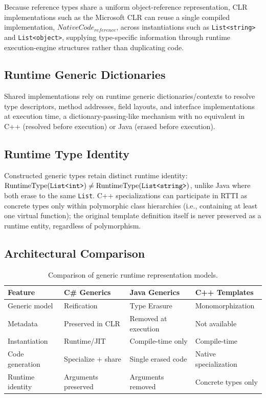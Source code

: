 \documentclass[11pt]{report}
\begin{document}
Because reference types share a uniform object-reference representation,
CLR implementations such as the Microsoft CLR can reuse a single compiled
implementation, $NativeCode_{reference}$, across instantiations such as
\texttt{List<string>} and \texttt{List<object>}, supplying type-specific
information through runtime execution-engine structures rather than
duplicating code.

\subsection{Runtime Generic Dictionaries}

Shared implementations rely on runtime generic dictionaries/contexts to
resolve type descriptors, method addresses, field layouts, and interface
implementations at execution time, a dictionary-passing-like mechanism
with no equivalent in C++ (resolved before execution) or Java (erased
before execution).

\subsection{Runtime Type Identity}
\label{CSharpGenerics:RuntimeRepresentation:TypeIdentity}

Constructed generic types retain distinct runtime identity:
$\text{RuntimeType}(\texttt{List<int>}) \neq \newline \text{RuntimeType}(\texttt{List<string>})$,
unlike Java where both erase to the same \texttt{List}. C++ specializations can participate in 
RTTI as concrete types only within
polymorphic class hierarchies (i.e., containing at least one virtual
function); the original template definition itself is never preserved as
a runtime entity, regardless of polymorphism.

\subsection{Architectural Comparison}

\begin{table}[h]
\centering
\begin{tabular}{|p{2.3cm}|p{2.9cm}|p{3.1cm}|p{2.9cm}|}
\hline
Feature & C\# Generics & Java Generics & C++ Templates \\
\hline
Generic model & Reification & Type Erasure & Monomorphization \\
\hline
Metadata & Preserved in CLR & Removed at execution & Not available \\
\hline
Instantiation & Runtime/JIT & Compile-time only & Compile-time \\
\hline
Code generation & Specialize + share & Single erased code & Native specialization \\
\hline
Runtime identity & Arguments preserved & Arguments removed & Concrete types only \\
\hline
\end{tabular}
\caption{Comparison of generic runtime representation models.}
\end{table}
\end{document}
